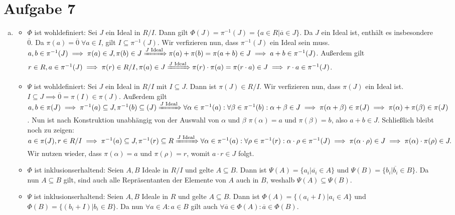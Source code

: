 \documentclass{article}
\theoremstyle{definition}
\begin{document}
\section*{Aufgabe 7}
\begin{enumerate}[(a)]
	\item
	\begin{itemize}
	\item  $\Phi$ ist wohldefiniert: Sei $J$ ein Ideal in $R/I$. Dann gilt $\Phi(J) = \pi^{-1}(J) = \{a \in R|\overline{a}\in J\}$. Da $J$ ein Ideal ist, enthält es insbesondere $\overline{0}$. Da $\pi(a) = \overline{0}\; \forall a \in I$, gilt $I\subseteq \pi^{-1}(J)$. Wir verfizieren nun, dass $\pi^{-1}(J)$ ein Ideal sein muss. $a, b\in \pi^{-1}(J) \implies \pi(a)\in J, \pi(b)\in J\xRightarrow{J\text{ Ideal}} \pi(a) + \pi(b) = \pi(a+b) \in J \implies a+b \in \pi^{-1}(J)$. Außerdem gilt $r \in R, a\in \pi^{-1}(J) \implies \pi(r) \in R/I, \pi(a) \in J\xRightarrow{J\text{ Ideal}} \pi(r)\cdot \pi(a) = \pi(r\cdot a) \in J \implies r\cdot a \in \pi^{-1}(J)$.
	 \item $\Psi$ ist wohldefiniert: Sei $J$ ein Ideal in $R/I$ mit $I\subseteq J$. Dann ist $\pi(J) \in R/I$. Wir verfizieren nun, dass $\pi(J)$ ein Ideal ist. $I \subseteq J \implies \overline{0} = \pi(I) \in \pi(J)$. Außerdem gilt $a, b \in \pi(J) \implies \pi^{-1}(a) \subseteq J, \pi^{-1}(b) \subseteq (J) \xRightarrow{J \text{ Ideal}} \forall \alpha \in \pi^{-1}(a):\forall \beta \in \pi^{-1}(b): \alpha + \beta \in J \implies \pi(\alpha + \beta) \in \pi(J) \implies \pi(\alpha) + \pi(\beta) \in \pi(J)$. Nun ist nach Konstruktion unabhängig von der Auswahl von $\alpha$ und $\beta$ $\pi(\alpha) = a$ und $\pi(\beta) = b$, also $a + b\in J$. Schließlich bleibt noch zu zeigen: $a\in \pi(J), r\in R/I\implies \pi^{-1}(a) \subseteq J, \pi^{-1}(r) \subseteq R\xRightarrow{J\text{ Ideal}} \forall \alpha \in \pi^{-1}(a): \forall \rho \in \pi^{-1}(r): \alpha \cdot \rho \in \pi^{-1}(J) \implies \pi(\alpha\cdot \rho)\in J \implies \pi(\alpha) \cdot \pi(\rho) \in J.$ Wir nutzen wieder, dass $\pi(\alpha) = a$ und $\pi(\rho) = r$, womit $a \cdot r \in J$ folgt.
	 \item $\Phi$ ist inklusionserhaltend: Seien $A,B$ Ideale in $R/I$ und gelte $A\subseteq B$. Dann ist $\Psi(A)=\{a_i|\overline{a_i}\in A\}$ und $\Psi(B)=\{b_i|\overline{b_i}\in B\}$. Da nun $A\subseteq B$ gilt, sind auch alle Repräsentanten der Elemente von $A$ auch in $B$, weshalb $\Psi(A)\subseteq \Psi(B)$.
	 \item $\Psi$ ist inklusionserhaltend: Seien $A,B$ Ideale in $R$ und gelte $A\subseteq B$. Dann ist $\Phi(A)=\{(a_i+I)|a_i\in A\}$ und $ \Phi(B)=\{(b_i+I)|b_i\in B\}$. Da nun $\forall a \in A: a\in B$ gilt auch $\forall \overline{a}\in\Phi(A): \overline{a}\in\Phi(B)$.

\end{itemize}
\end{enumerate}
\end{document}
